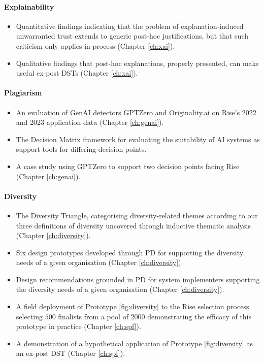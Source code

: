 \paragraph{Explainability}
\begin{itemize}
    \item Quantitative findings indicating that the problem of explanation-induced unwarranted trust extends to generic post-hoc justifications, but that such criticism only applies in process (Chapter \ref{ch:xai}).
    \item Qualitative findings that post-hoc explanations, properly presented, can make useful ex-post DSTs (Chapter \ref{ch:xai}).
\end{itemize}

\paragraph{Plagiarism}
\begin{itemize}
    \item An evaluation of GenAI detectors GPTZero and Originality.ai on Rise's 2022 and 2023 application data (Chapter \ref{ch:genai}).
    \item The Decision Matrix framework for evaluating the suitability of AI systems as support tools for differing decision points.
    \item A case study using GPTZero to support two decision points facing Rise (Chapter \ref{ch:genai}).
\end{itemize}

\paragraph{Diversity}
\begin{itemize}
    \item The Diversity Triangle, categorising diversity-related themes according to our three definitions of diversity uncovered through inductive thematic analysis (Chapter \ref{ch:diversity}).
    \item Six design prototypes developed through PD for supporting the diversity needs of a given organisation (Chapter \ref{ch:diversity}).
    \item Design recommendations grounded in PD for system implementers supporting the diversity needs of a given organisation (Chapter \ref{ch:diversity}).
    \item A field deployment of Prototype \ref{fig:diversity} to the Rise selection process selecting $500$ finalists from a pool of $2000$ demonstrating the efficacy of this prototype in practice (Chapter \ref{ch:spf}).
    \item A demonstration of a hypothetical application of Prototype \ref{fig:diversity} as an ex-post DST (Chapter \ref{ch:spf}).
\end{itemize}

